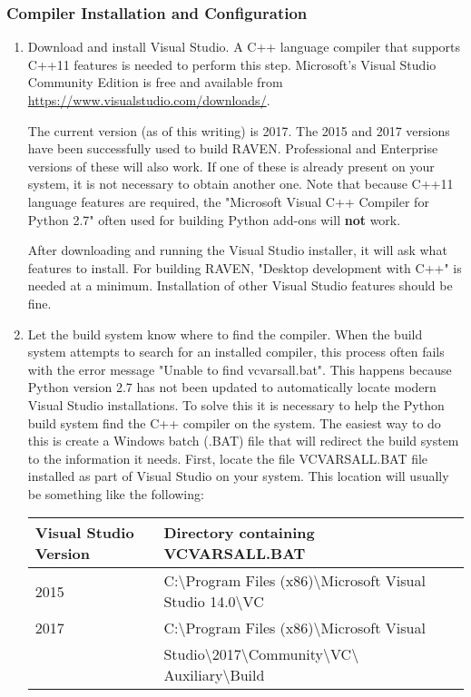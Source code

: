 \subsubsection{Compiler Installation and Configuration}
\begin{enumerate}
	\item Download and install Visual Studio.  A C++ language compiler that supports C++11 features
		is needed to perform this step. Microsoft's Visual Studio Community Edition is free and
		available from \url{https://www.visualstudio.com/downloads/}.

		The current version (as of this writing) is 2017. The 2015 and 2017 versions have been
		successfully used to build RAVEN. Professional and Enterprise versions of these will
		also work. If one of these is already present on your system, it is not necessary to
		obtain another one. Note that because C++11 language features are required, the
		"Microsoft Visual C++ Compiler for Python 2.7" often used for building Python
		add-ons will {\bf not} work.

		After downloading and running the Visual Studio installer, it will ask what features
		to install. For building RAVEN, "Desktop development with C++" is needed at a minimum.
		Installation of other Visual Studio features should be fine.

	\item Let the build system know where to find the compiler.  When the build system attempts
		to search for an installed compiler, this process often fails with the error message
		"Unable to find vcvarsall.bat".  This happens because Python version 2.7 has not been
		updated to automatically locate modern Visual Studio installations. To solve this it
		is necessary to help the Python build system find the C++ compiler on the system.
		The easiest way to do this is create a Windows batch (.BAT) file that will redirect
		the build system to the information it needs. First, locate the file VCVARSALL.BAT
		file installed as part of Visual Studio on your system. This location will usually
		be something like the following:
		\smallskip

\begin{tabular}{| l | l |}
	\hline
	{\bf Visual Studio Version} & {\bf Directory containing VCVARSALL.BAT} \\\hline
	2015 & C:\textbackslash Program Files (x86)\textbackslash Microsoft Visual Studio 14.0\textbackslash VC \\\hline
	2017 & C:\textbackslash Program Files (x86)\textbackslash Microsoft Visual \\
               & Studio\textbackslash 2017\textbackslash Community\textbackslash VC\textbackslash
                Auxiliary\textbackslash Build \\\hline
\end{tabular}


\end{enumerate}
